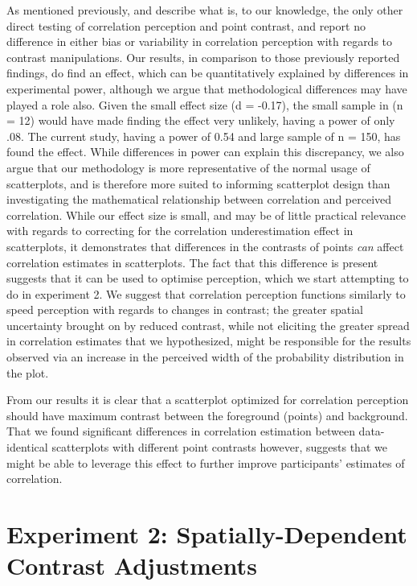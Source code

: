 \documentclass[preprint, 3p,
authoryear]{elsarticle} %
\begin{document}
As mentioned previously, \citet{rensink_2012} and \citet{rensink_2014}
describe what is, to our knowledge, the only other direct testing of
correlation perception and point contrast, and report no difference in
either bias or variability in correlation perception with regards to
contrast manipulations. Our results, in comparison to those previously
reported findings, do find an effect, which can be quantitatively
explained by differences in experimental power, although we argue that
methodological differences may have played a role also. Given the small
effect size (d = -0.17), the small sample in \citet{rensink_2014} (n =
12) would have made finding the effect very unlikely, having a power of
only .08. The current study, having a power of 0.54 and large sample of
n = 150, has found the effect. While differences in power can explain
this discrepancy, we also argue that our methodology is more
representative of the normal usage of scatterplots, and is therefore
more suited to informing scatterplot design than investigating the
mathematical relationship between correlation and perceived correlation.
While our effect size is small, and may be of little practical relevance
with regards to correcting for the correlation underestimation effect in
scatterplots, it demonstrates that differences in the contrasts of
points \emph{can} affect correlation estimates in scatterplots. The fact
that this difference is present suggests that it can be used to optimise
perception, which we start attempting to do in experiment 2. We suggest
that correlation perception functions similarly to speed perception
\citep{champion_2017} with regards to changes in contrast; the greater
spatial uncertainty brought on by reduced contrast, while not eliciting
the greater spread in correlation estimates that we hypothesized, might
be responsible for the results observed via an increase in the perceived
width of the probability distribution in the plot.

From our results it is clear that a scatterplot optimized for
correlation perception should have maximum contrast between the
foreground (points) and background. That we found significant
differences in correlation estimation between data-identical
scatterplots with different point contrasts however, suggests that we
might be able to leverage this effect to further improve participants'
estimates of correlation.

\hypertarget{experiment-2-spatially-dependent-contrast-adjustments}{%
\section{Experiment 2: Spatially-Dependent Contrast
Adjustments}\label{experiment-2-spatially-dependent-contrast-adjustments}}
\end{document}
